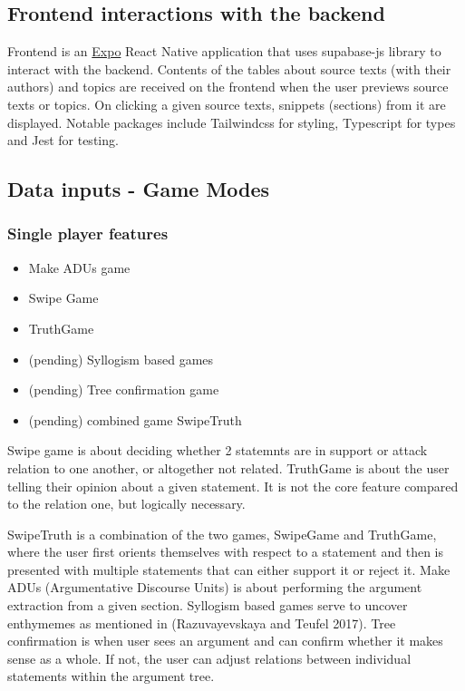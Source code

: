 \documentclass{article}
\begin{document}
\subsection{Frontend interactions with the backend}

Frontend is an \href{https://expo.dev/}{Expo} React Native application that uses supabase-js library to interact with the backend.
Contents of the tables about source texts (with their authors) and topics are received on the frontend when the user previews source texts or topics. On clicking a given source texts, snippets (sections) from it are displayed.
Notable packages include Tailwindcss for styling, Typescript for types and Jest for testing. 

\subsection{Data inputs - Game Modes}
\subsubsection{Single player features}
\begin{itemize}
  \item Make ADUs game
  \item Swipe Game
  \item TruthGame 
  \item (pending) Syllogism based games
  \item (pending) Tree confirmation game
  \item (pending) combined game SwipeTruth
\end{itemize}
Swipe game is about deciding whether 2 statemnts are in support or attack relation to one another, or altogether not related.
TruthGame is about the user telling their opinion about a given statement. It is not the core feature compared to the relation one, but logically necessary.

SwipeTruth is a combination of the two games, SwipeGame and TruthGame, where the user first orients themselves with respect to a statement and then is presented with multiple statements that can either support it or reject it.
Make ADUs (Argumentative Discourse Units) is about performing the argument extraction from a given section.
Syllogism based games serve to uncover enthymemes as mentioned in (Razuvayevskaya and Teufel 2017). 
Tree confirmation is when user sees an argument and can confirm whether it makes sense as a whole. If not, the user can adjust relations between individual statements within the argument tree.
\end{document}
